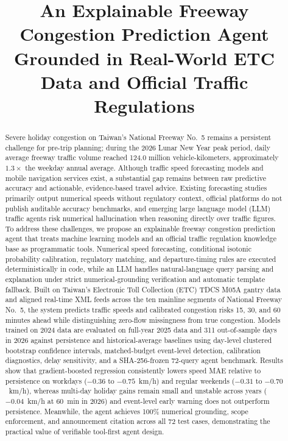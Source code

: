\documentclass[conference]{IEEEtran}
\begin{document}
\title{An Explainable Freeway Congestion Prediction Agent Grounded in Real-World ETC Data and Official Traffic Regulations}

\author{
}

\maketitle

\begin{abstract}
Severe holiday congestion on Taiwan's National Freeway No.~5 remains a persistent challenge for pre-trip planning; during the 2026 Lunar New Year peak period, daily average freeway traffic volume reached 124.0 million vehicle-kilometers, approximately $1.3\times$ the weekday annual average. Although traffic speed forecasting models and mobile navigation services exist, a substantial gap remains between raw predictive accuracy and actionable, evidence-based travel advice. Existing forecasting studies primarily output numerical speeds without regulatory context, official platforms do not publish auditable accuracy benchmarks, and emerging large language model (LLM) traffic agents risk numerical hallucination when reasoning directly over traffic figures. To address these challenges, we propose an explainable freeway congestion prediction agent that treats machine learning models and an official traffic regulation knowledge base as programmatic tools. Numerical speed forecasting, conditional isotonic probability calibration, regulatory matching, and departure-timing rules are executed deterministically in code, while an LLM handles natural-language query parsing and explanation under strict numerical-grounding verification and automatic template fallback. Built on Taiwan's Electronic Toll Collection (ETC) TDCS M05A gantry data and aligned real-time XML feeds across the ten mainline segments of National Freeway No.~5, the system predicts traffic speeds and calibrated congestion risks 15, 30, and 60 minutes ahead while distinguishing zero-flow missingness from true congestion. Models trained on 2024 data are evaluated on full-year 2025 data and 311 out-of-sample days in 2026 against persistence and historical-average baselines using day-level clustered bootstrap confidence intervals, matched-budget event-level detection, calibration diagnostics, delay sensitivity, and a SHA-256-frozen 72-query agent benchmark. Results show that gradient-boosted regression consistently lowers speed MAE relative to persistence on workdays ($-0.36$ to $-0.75$~km/h) and regular weekends ($-0.31$ to $-0.70$~km/h), whereas multi-day holiday gains remain small and unstable across years ($-0.04$~km/h at 60~min in 2026) and event-level early warning does not outperform persistence. Meanwhile, the agent achieves 100\% numerical grounding, scope enforcement, and announcement citation across all 72 test cases, demonstrating the practical value of verifiable tool-first agent design.

\end{abstract}
\end{document}

